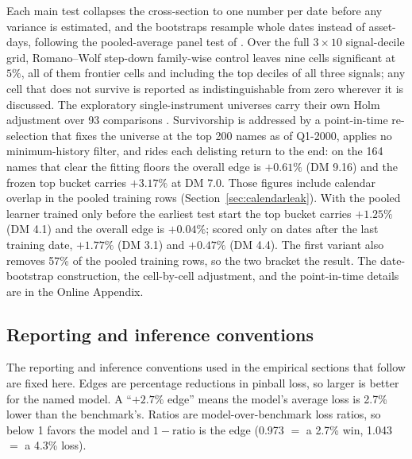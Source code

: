 \documentclass[11pt]{article}
\theoremstyle{remark}
\begin{document}
Each main test collapses the cross-section to one number per date before
any variance is estimated, and the bootstraps resample whole dates instead of
asset-days, following the pooled-average panel test of
\citet{qutimmermannzhu2024}. Over the full $3\times10$ signal-decile
grid, Romano--Wolf step-down family-wise control
\citep{romanowolf2005, romanowolf2016} leaves nine cells significant at
$5\%$, all of them frontier cells and including the top deciles of all
three signals; any cell that does not survive is reported as
indistinguishable from zero wherever it is discussed. The exploratory
single-instrument universes carry their own Holm adjustment over 93
comparisons \citep{holm1979}. Survivorship is addressed by a
point-in-time re-selection that fixes the universe at the top 200 names
as of Q1-2000, applies no minimum-history filter, and rides each
delisting return to the end: on the 164 names that clear the fitting
floors the overall edge is $+0.61\%$ (DM 9.16) and the frozen top bucket
carries $+3.17\%$ at DM 7.0. Those figures include calendar overlap in the pooled training rows (Section~\ref{sec:calendarleak}). With the pooled learner trained only before the earliest test start the top bucket carries $+1.25\%$ (DM 4.1) and the overall edge is $+0.04\%$; scored only on dates after the last training date, $+1.77\%$ (DM 3.1) and $+0.47\%$ (DM 4.4). The first variant also removes 57\% of the pooled training rows, so the two bracket the result.
The date-bootstrap construction, the cell-by-cell adjustment, and the
point-in-time details are in the Online Appendix.

\subsection{Reporting and inference conventions}\label{sec:conventions}
The reporting and inference conventions used in the empirical sections that follow are fixed here. Edges are percentage
reductions in pinball loss, so larger is better for the named
model. A ``$+2.7\%$ edge'' means the model's average loss is 2.7\%
lower than the benchmark's. Ratios are model-over-benchmark
loss ratios, so below 1 favors the model and $1-\text{ratio}$ is
the edge (0.973 $=$ a 2.7\% win, 1.043 $=$ a 4.3\% loss).
\end{document}
